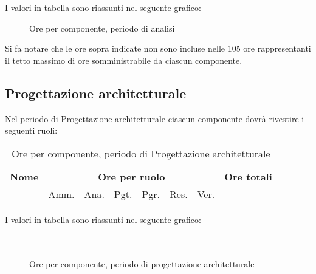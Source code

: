 I valori in tabella sono riassunti nel seguente grafico: \\ 

\begin{figure}[H]
\caption{Ore per componente, periodo di analisi}
\end{figure}

Si fa notare che le ore sopra indicate non sono incluse nelle 105 ore rappresentanti il tetto massimo di ore somministrabile da ciascun componente.

\pagebreak
\subsection{Progettazione architetturale}

Nel periodo di Progettazione architetturale ciascun componente dovrà rivestire i seguenti ruoli:

\begin{table}[H]
\centering
\begin{tabular}{lccccccc}
\toprule 
    \textbf{Nome}  & \multicolumn{6}{c}{\textbf{Ore per ruolo}} & \textbf{Ore totali} \\
     & Amm. & Ana. & Pgt. & Pgr. & Res. & Ver. \\
    \midrule
    
    	
    
    \bottomrule
\end{tabular}
\caption{Ore per componente, periodo di Progettazione architetturale}
\end{table}
I valori in tabella sono riassunti nel seguente grafico: \\ \\ \\

\begin{figure}[H]
\caption{Ore per componente, periodo di progettazione architetturale}
\end{figure}

